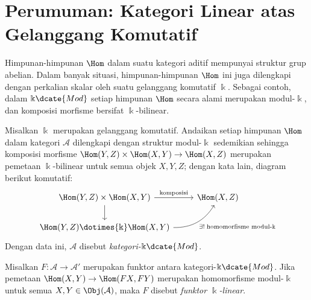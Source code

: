 
\section{Perumuman: Kategori Linear atas Gelanggang Komutatif}\label{sec:linear-cat}
\hypertarget{o014.aljabr2.chapter1.linear-categories-over-commutative-rings}{ }

Himpunan-himpunan $\Hom$ dalam suatu kategori aditif mempunyai struktur grup
abelian. Dalam banyak situasi, himpunan-himpunan $\Hom$ ini juga dilengkapi
dengan perkalian skalar oleh suatu gelanggang komutatif $\Bbbk$. Sebagai
contoh, dalam $\Bbbk\dcate{Mod}$ setiap himpunan $\Hom$ secara alami merupakan
modul-$\Bbbk$, dan komposisi morfisme bersifat $\Bbbk$-bilinear.

\begin{definisi}\label{def:cat-k-linear}
	Misalkan $\Bbbk$ merupakan gelanggang komutatif. Andaikan setiap himpunan
	$\Hom$ dalam kategori $\mathcal{A}$ dilengkapi dengan struktur
	modul-$\Bbbk$ sedemikian sehingga komposisi morfisme
	$\Hom(Y, Z) \times \Hom(X, Y) \to \Hom(X, Z)$ merupakan pemetaan
	$\Bbbk$-bilinear untuk semua objek $X,Y,Z$; dengan kata lain, diagram
	berikut komutatif:
	\[\begin{tikzcd}
		\Hom(Y, Z) \times \Hom(X, Y) \arrow[d] \arrow[r, "\text{komposisi}"] & \Hom(X, Z) \\
		\Hom(Y, Z) \dotimes{\Bbbk} \Hom(X, Y) \arrow[ru, bend right, start anchor=east, "{\exists! \; \text{homomorfisme modul-$\Bbbk$}}"']
	\end{tikzcd}  \]
	Dengan data ini, $\mathcal{A}$ disebut \emph{kategori-$\Bbbk\dcate{Mod}$}.

	Misalkan $F: \mathcal{A} \to \mathcal{A}'$ merupakan funktor antara
	kategori-$\Bbbk\dcate{Mod}$. Jika pemetaan
	$\Hom(X,Y) \to \Hom(FX,FY)$ merupakan homomorfisme modul-$\Bbbk$ untuk
	semua $X,Y \in \Obj(\mathcal{A})$, maka $F$ disebut
	\emph{funktor $\Bbbk$-linear}.
\end{definisi}

